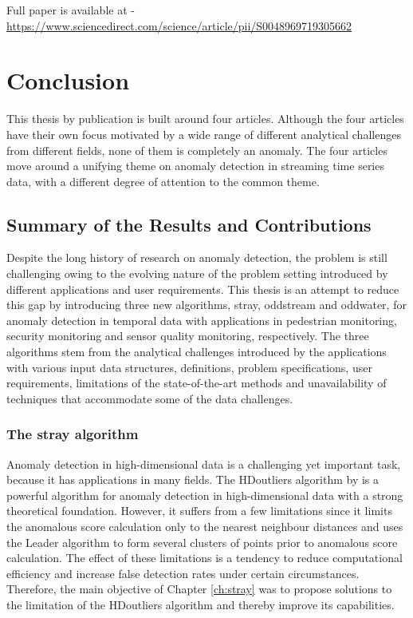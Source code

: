 \documentclass{monashthesis}
\theoremstyle{definition}
\theoremstyle{definition}
\theoremstyle{definition}
\theoremstyle{remark}
\begin{document}
Full paper is available at - \url{https://www.sciencedirect.com/science/article/pii/S0048969719305662}

\hypertarget{ch:conclusion}{%
\chapter{Conclusion}\label{ch:conclusion}}

This thesis by publication is built around four articles. Although the four articles have their own focus motivated by a wide range of different analytical challenges from different fields, none of them is completely an anomaly. The four articles move around a unifying theme on anomaly detection in streaming time series data, with a different degree of attention to the common theme.

\hypertarget{summary-of-the-results-and-contributions}{%
\section{Summary of the Results and Contributions}\label{summary-of-the-results-and-contributions}}

Despite the long history of research on anomaly detection, the problem is still challenging owing to the evolving nature of the problem setting introduced by different applications and user requirements. This thesis is an attempt to reduce this gap by introducing three new algorithms, stray, oddstream and oddwater, for anomaly detection in temporal data with applications in pedestrian monitoring, security monitoring and sensor quality monitoring, respectively. The three algorithms stem from the analytical challenges introduced by the applications with various input data structures, definitions, problem specifications, user requirements, limitations of the state-of-the-art methods and unavailability of techniques that accommodate some of the data challenges.

\hypertarget{the-stray-algorithm}{%
\subsection{The stray algorithm}\label{the-stray-algorithm}}

Anomaly detection in high-dimensional data is a challenging yet important task, because it has applications in many fields. The HDoutliers algorithm by \textcite{wilkinsonvisualizing} is a powerful algorithm for anomaly detection in high-dimensional data with a strong theoretical foundation. However, it suffers from a few limitations since it limits the anomalous score calculation only to the nearest neighbour distances and uses the Leader algorithm to form several clusters of points prior to anomalous score calculation. The effect of these limitations is a tendency to reduce computational efficiency and increase false detection rates under certain circumstances. Therefore, the main objective of Chapter \ref{ch:stray} was to propose solutions to the limitation of the HDoutliers algorithm and thereby improve its capabilities.
\end{document}
